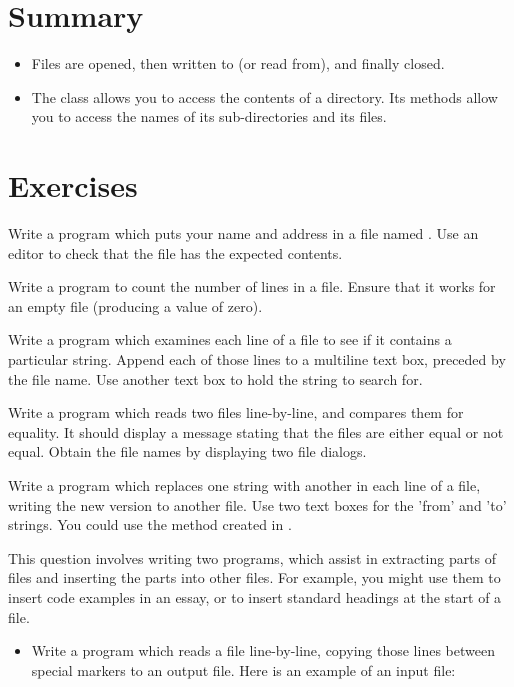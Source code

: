 	\section{Summary}
		\begin{itemize}
      \item Files are opened, then written to (or read from), and finally closed.
      \item The  class allows you to access the contents of a directory. Its methods allow you to access the names of its sub-directories and its files.
		\end{itemize}

	\section{Exercises}
		\begin{EXE}
			\item	Write a program which puts your name and address in a file named . Use an editor to check that the file has the expected contents.
			\item	Write a program to count the number of lines in a file. Ensure that it works for an empty file (producing a value of zero).
			\item	Write a program which examines each line of a file to see if it contains a particular string. Append each of those lines to a multiline text box, preceded by the file name. Use another text box to hold the string to search for.
			\item	Write a program which reads two files line-by-line, and compares them for equality. It should display a message stating that the files are either equal or not equal. Obtain the file names by displaying two file dialogs.
			\item	Write a program which replaces one string with another in each line of a file, writing the new version to another file. Use two text boxes for the 'from' and 'to' strings. You could use the  method created in .
			\item	This question involves writing two programs, which assist in extracting parts of files and inserting the parts into other files. For example, you might use them to insert code examples in an essay, or to insert standard headings at the start of a file.
				\begin{itemize}
		      \item Write a program which reads a file line-by-line, copying those lines between special markers to an output file. Here is an example of an input file:

\end{itemize}
\end{EXE}

